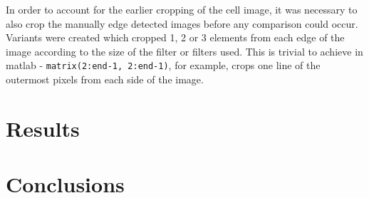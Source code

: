 \documentclass[12pt]{article}
\begin{document}
  In order to account for the earlier cropping of the cell image, it was necessary to also crop the manually edge detected images before any comparison could occur. Variants were created which cropped 1, 2 or 3 elements from each edge of the image according to the size of the filter or filters used. This is trivial to achieve in matlab - \texttt{matrix(2:end-1, 2:end-1)}, for example, crops one line of the outermost pixels from each side of the image.

  \section{Results}

  \section{Conclusions}
\end{document}
